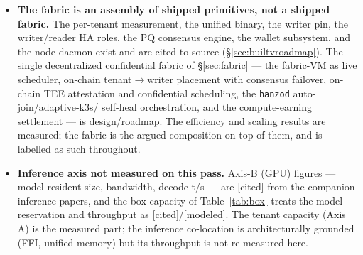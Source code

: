 \documentclass[11pt]{article}
\newcommand{\modeled}{\textcolor{orange!70!black}{\small[modeled]}}
\newcommand{\cited}{\textcolor{purple!70!black}{\small[cited]}}
\begin{document}
\begin{itemize}[leftmargin=1.4em]
\item \textbf{The fabric is an assembly of shipped primitives, not a shipped fabric.} The
per-tenant measurement, the unified binary, the writer pin, the writer/reader HA roles, the PQ
consensus engine, the wallet subsystem, and the node daemon exist and are cited to source
(\S\ref{sec:builtvroadmap}). The single decentralized confidential fabric of \S\ref{sec:fabric}
--- the fabric-VM as live scheduler, on-chain tenant$\to$writer placement with consensus failover,
on-chain TEE attestation and confidential scheduling, the \texttt{hanzod} auto-join/adaptive-k3s/
self-heal orchestration, and the compute-earning settlement --- is design/roadmap. The efficiency
and scaling results are measured; the fabric is the argued composition on top of them, and is
labelled as such throughout.

\item \textbf{Inference axis not measured on this pass.} Axis-B (GPU) figures --- model resident
size, bandwidth, decode t/s --- are \cited{} from the companion inference papers, and the box
capacity of Table~\ref{tab:box} treats the model reservation and throughput as \cited{}/\modeled{}.
The tenant capacity (Axis A) is the measured part; the inference co-location is architecturally
grounded (FFI, unified memory) but its throughput is not re-measured here.
\end{itemize}
\end{document}
